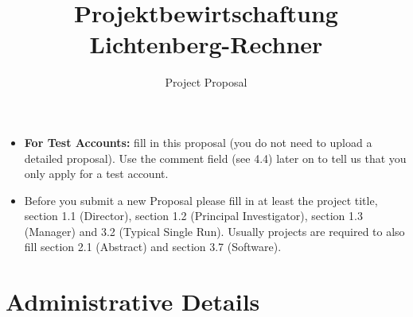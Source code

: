\documentclass[accentcolor=tud9c,nochapname,11pt]{tudexercise}
\begin{document}
\title{Projektbewirtschaftung \\ Lichtenberg-Rechner}
\subtitle{Project Proposal}
\maketitle

\begin{itemize}
	\item \textbf{For Test Accounts:} fill in this proposal (you do not need to upload a detailed proposal). Use the comment field (see 4.4) later on to tell us that you only apply for a test account.
	\item Before you submit a new Proposal please fill in at least the project title, section 1.1 (Director), section 1.2 (Principal Investigator), section 1.3 (Manager) and 3.2 (Typical Single Run). Usually projects are required to also fill section 2.1 (Abstract) and section 3.7 (Software).
\end{itemize}

\section{Administrative Details}
\end{document}
